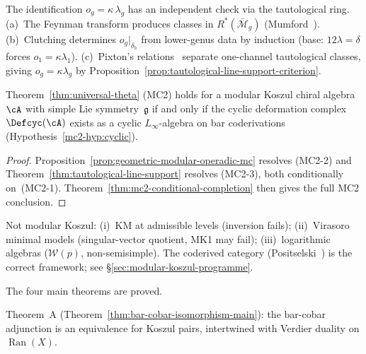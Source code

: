 \begin{remark}
\label{rem:tautological-ring-verification}
The identification $o_g=\kappa\,\lambda_g$ has an independent check
via the tautological ring.
(a)~The Feynman transform produces classes in
$R^*(\overline{\mathcal{M}}_g)$ (Mumford~\cite{Mumford83}).
(b)~Clutching determines $o_g|_{\delta_h}$ from lower-genus data
by induction (base: $12\lambda=\delta$ forces $o_1=\kappa\lambda_1$).
(c)~Pixton's relations~\cite{Janda17,PPZ19} separate one-channel
tautological classes, giving $o_g=\kappa\lambda_g$ by
Proposition~\ref{prop:tautological-line-support-criterion}.
\end{remark}

\begin{corollary}
\label{cor:mc2-single-hypothesis}
Theorem~\textup{\ref{thm:universal-theta}} \textup{(MC2)} holds
for a modular Koszul chiral algebra $\cA$ with simple Lie
symmetry~$\mathfrak{g}$ if and only if the cyclic deformation
complex $\Defcyc(\cA)$ exists as a cyclic $L_\infty$-algebra on
bar coderivations \textup{(}Hypothesis~\textup{\ref{mc2-hyp:cyclic}}\textup{)}.
\end{corollary}

\begin{proof}
Proposition~\ref{prop:geometric-modular-operadic-mc} resolves
(MC2-2) and Theorem~\ref{thm:tautological-line-support} resolves
(MC2-3), both conditionally on~(MC2-1).
Theorem~\ref{thm:mc2-conditional-completion} then gives the full
MC2 conclusion.
\end{proof}

\begin{remark}\label{rem:mk-non-examples}
Not modular Koszul: (i)~KM at admissible levels (inversion fails);
(ii)~Virasoro minimal models (singular-vector quotient, MK1 may fail);
(iii)~logarithmic algebras ($\mathcal{W}(p)$, non-semisimple).
The coderived category (Positselski~\cite{Positselski11}) is the
correct framework; see \S\ref{sec:modular-koszul-programme}.
\end{remark}

The four main theorems are proved.

Theorem~A
(Theorem~\ref{thm:bar-cobar-isomorphism-main}): the bar-cobar
adjunction is an equivalence for Koszul pairs, intertwined with
Verdier duality on $\operatorname{Ran}(X)$.

